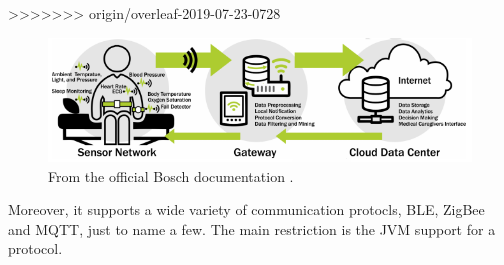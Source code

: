 >>>>>>> origin/overleaf-2019-07-23-0728
\begin{figure}[h!]
    \centering
    \includegraphics[scale=0.8]{figures/iotSetup.png}
    \caption{From the official Bosch documentation \cite{BoschIoT13:online}.}
    \label{fig:boschIoTGatewaySetup}
\end{figure}
Moreover, it supports a wide variety of communication protocls, BLE, ZigBee and MQTT, just to name a few. The main restriction is the JVM support for a protocol.  

